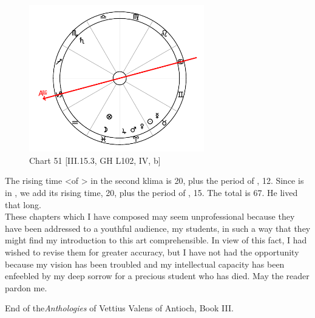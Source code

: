 \clearpage
\begin{figure}
\centering
\vspace{-20pt}
\includegraphics[width=0.68\textwidth]{charts/3_15_3}
\caption{Chart 51 [III.15.3, GH L102, IV, b]}
\label{fig:chart51}
\end{figure} 

The rising time <of \Pisces> in the second klima is 20, plus the period of \Jupiter, 12. Since \Jupiter is in \Aries, we add its rising time, 20, plus the period of \Mars, 15. The total is 67. He lived that long. \\
\newline
\newline
These chapters which I have composed may seem unprofessional because they have been addressed to a youthful audience, my students, in such a way that they might find my introduction to this art comprehensible. In view of this fact, I had wished to revise them for greater accuracy, but I have not had the opportunity because my vision has been troubled and my intellectual capacity has been enfeebled by my deep sorrow for a precious student who has died. May the reader pardon me.

End of the\textit{Anthologies} of Vettius Valens of Antioch, Book III.

\newpage